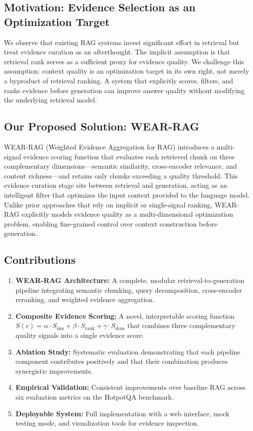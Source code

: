 \documentclass[conference]{IEEEtran}
\begin{document}
\subsection{Motivation: Evidence Selection as an Optimization Target}

We observe that existing RAG systems invest significant effort in retrieval but treat evidence curation as an afterthought. The implicit assumption is that retrieval rank serves as a sufficient proxy for evidence quality. We challenge this assumption: context quality is an optimization target in its own right, not merely a byproduct of retrieval ranking. A system that explicitly scores, filters, and ranks evidence before generation can improve answer quality without modifying the underlying retrieval model.

\subsection{Our Proposed Solution: WEAR-RAG}

WEAR-RAG (Weighted Evidence Aggregation for RAG) introduces a multi-signal evidence scoring function that evaluates each retrieved chunk on three complementary dimensions---semantic similarity, cross-encoder relevance, and content richness---and retains only chunks exceeding a quality threshold. This evidence curation stage sits between retrieval and generation, acting as an intelligent filter that optimizes the input context provided to the language model. Unlike prior approaches that rely on implicit or single-signal ranking, WEAR-RAG explicitly models evidence quality as a multi-dimensional optimization problem, enabling fine-grained control over context construction before generation.

\subsection{Contributions}
\begin{enumerate}[leftmargin=*]
\item \textbf{WEAR-RAG Architecture:} A complete, modular retrieval-to-generation pipeline integrating semantic chunking, query decomposition, cross-encoder reranking, and weighted evidence aggregation.
\item \textbf{Composite Evidence Scoring:} A novel, interpretable scoring function $S(c) = \alpha \cdot S_{\text{sim}} + \beta \cdot S_{\text{rank}} + \gamma \cdot S_{\text{dens}}$ that combines three complementary quality signals into a single evidence score.
\item \textbf{Ablation Study:} Systematic evaluation demonstrating that each pipeline component contributes positively and that their combination produces synergistic improvements.
\item \textbf{Empirical Validation:} Consistent improvements over baseline RAG across six evaluation metrics on the HotpotQA benchmark.
\item \textbf{Deployable System:} Full implementation with a web interface, mock testing mode, and visualization tools for evidence inspection.
\end{enumerate}
\end{document}

